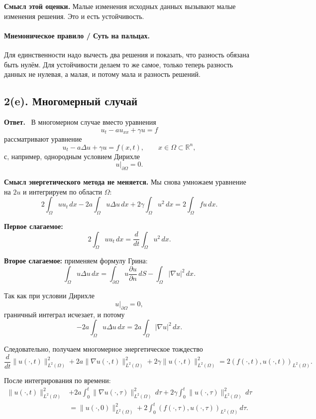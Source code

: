 \documentclass[a4paper,12pt]{article}
\newcommand{\R}{\mathbb{R}}
\newcommand{\Answer}{\textbf{Ответ.}\ }
\begin{document}
\textbf{Смысл этой оценки.} Малые изменения исходных данных вызывают малые изменения решения. Это и есть устойчивость.

\paragraph{Мнемоническое правило / Суть на пальцах.}
Для единственности надо вычесть два решения и показать, что разность обязана быть нулём. Для устойчивости делаем то же самое, только теперь разность данных не нулевая, а малая, и потому мала и разность решений.

\subsection*{2(e). Многомерный случай}

\Answer
В многомерном случае вместо уравнения
\[
u_t-a u_{xx}+\gamma u=f
\]
рассматривают уравнение
\[
u_t-a\Delta u+\gamma u=f(x,t),
\qquad x\in\Omega\subset\R^n,
\]
с, например, однородным условием Дирихле
\[
u|_{\partial\Omega}=0.
\]

\textbf{Смысл энергетического метода не меняется.} Мы снова умножаем уравнение на $2u$ и интегрируем по области $\Omega$:
\[
2\int_\Omega u u_t\,dx
-2a\int_\Omega u\Delta u\,dx
+2\gamma\int_\Omega u^2\,dx
=
2\int_\Omega fu\,dx.
\]

\textbf{Первое слагаемое:}
\[
2\int_\Omega u u_t\,dx=\frac{d}{dt}\int_\Omega u^2\,dx.
\]

\textbf{Второе слагаемое:} применяем формулу Грина:
\[
\int_\Omega u\Delta u\,dx
=
\int_{\partial\Omega}u\frac{\partial u}{\partial n}\,dS
-\int_\Omega |\nabla u|^2\,dx.
\]

Так как при условии Дирихле
\[
u|_{\partial\Omega}=0,
\]
граничный интеграл исчезает, и потому
\[
-2a\int_\Omega u\Delta u\,dx
=
2a\int_\Omega |\nabla u|^2\,dx.
\]

Следовательно, получаем многомерное энергетическое тождество
\[
\frac{d}{dt}\|u(\cdot,t)\|_{L^2(\Omega)}^2
+2a\|\nabla u(\cdot,t)\|_{L^2(\Omega)}^2
+2\gamma\|u(\cdot,t)\|_{L^2(\Omega)}^2
=
2(f(\cdot,t),u(\cdot,t))_{L^2(\Omega)}.
\]

После интегрирования по времени:
\[
\begin{aligned}
\|u(\cdot,t)\|_{L^2(\Omega)}^2
&+2a\int_0^t \|\nabla u(\cdot,\tau)\|_{L^2(\Omega)}^2\,d\tau
+2\gamma\int_0^t \|u(\cdot,\tau)\|_{L^2(\Omega)}^2\,d\tau
\\
&=
\|u(\cdot,0)\|_{L^2(\Omega)}^2
+2\int_0^t (f(\cdot,\tau),u(\cdot,\tau))_{L^2(\Omega)}\,d\tau.
\end{aligned}
\]
\end{document}
